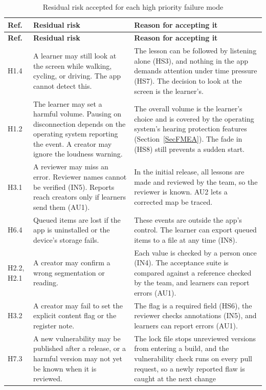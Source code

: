 \documentclass{article}
\begin{document}
{\small
\begin{longtable}{@{}lP{0.42\textwidth}P{0.42\textwidth}@{}}
\caption{Residual risk accepted for each high priority failure mode}
\label{TblResidual}\\
\toprule
\textbf{Ref.} & \textbf{Residual risk} & \textbf{Reason for accepting it}\\
\midrule
\endfirsthead
\toprule
\textbf{Ref.} & \textbf{Residual risk} & \textbf{Reason for accepting it}\\
\midrule
\endhead
H1.4 & A learner may still look at the screen while walking, cycling, or
driving. The app cannot detect this. & The lesson can be followed by
listening alone (HS3), and nothing in the app demands attention under time
pressure (HS7). The decision to look at the screen is the learner's.\\
H1.2 & The learner may set a harmful volume. Pausing on disconnection depends
on the operating system reporting the event. A creator may ignore the loudness
warning. & The overall volume is the learner's choice and is covered by the
operating system's hearing protection features (Section~\ref{SecFMEA}). The
fade in (HS8) still prevents a sudden start.\\
H3.1 & A reviewer may miss an error. Reviewer names cannot be verified (IN5).
Reports reach creators only if learners send them (AU1). & In the initial
release, all lessons are made and reviewed by the team, so the reviewer is
known. AU2 lets a corrected map be traced.\\
H6.4 & Queued items are lost if the app is uninstalled or the device's storage
fails. & These events are outside the app's control. The learner can export
queued items to a file at any time (IN8).\\
H2.2, H2.1 & A creator may confirm a wrong segmentation or reading. & Each
value is checked by a person once (IN4). The acceptance suite is compared
against a reference checked by the team, and learners can report errors
(AU1).\\
H3.2 & A creator may fail to set the explicit content flag or the register
note. & The flag is a required field (HS6), the reviewer checks annotations
(IN5), and learners can report errors (AU1).\\
H7.3 & A new vulnerability may be published after a release, or a harmful
version may not yet be known when it is reviewed. & The lock file stops
unreviewed versions from entering a build, and the vulnerability check runs on
every pull request, so a newly reported flaw is caught at the next change

\end{longtable}}
\end{document}
